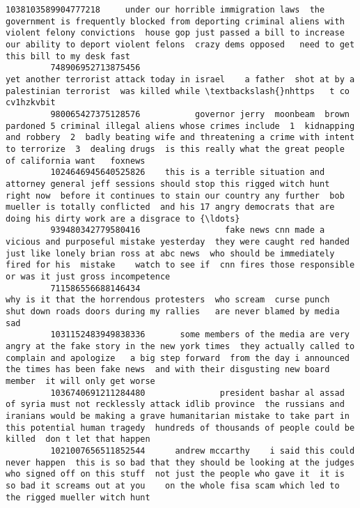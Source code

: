 \documentclass[11pt]{article}
\begin{document}
\begin{Verbatim}[commandchars=\\\{\}]
         1038103589904777218     under our horrible immigration laws  the government is frequently blocked from deporting criminal aliens with violent felony convictions  house gop just passed a bill to increase our ability to deport violent felons  crazy dems opposed   need to get this bill to my desk fast    
         748906952713875456                                                                                                                                                  yet another terrorist attack today in israel    a father  shot at by a palestinian terrorist  was killed while \textbackslash{}nhttps   t co cv1hzkvbit   
         980065427375128576           governor jerry  moonbeam  brown pardoned 5 criminal illegal aliens whose crimes include  1  kidnapping and robbery  2  badly beating wife and threatening a crime with intent to terrorize  3  dealing drugs  is this really what the great people of california want   foxnews   
         1024646945640525826    this is a terrible situation and attorney general jeff sessions should stop this rigged witch hunt right now  before it continues to stain our country any further  bob mueller is totally conflicted  and his 17 angry democrats that are doing his dirty work are a disgrace to {\ldots}   
         939480342779580416                 fake news cnn made a vicious and purposeful mistake yesterday  they were caught red handed  just like lonely brian ross at abc news  who should be immediately fired for his  mistake    watch to see if  cnn fires those responsible  or was it just gross incompetence    
         711586556688146434                                                                                                                                              why is it that the horrendous protesters  who scream  curse punch  shut down roads doors during my rallies   are never blamed by media  sad    
         1031152483949838336       some members of the media are very angry at the fake story in the new york times  they actually called to complain and apologize   a big step forward  from the day i announced  the times has been fake news  and with their disgusting new board member  it will only get worse    
         1036740691211284480               president bashar al assad of syria must not recklessly attack idlib province  the russians and iranians would be making a grave humanitarian mistake to take part in this potential human tragedy  hundreds of thousands of people could be killed  don t let that happen    
         1021007656511852544      andrew mccarthy    i said this could never happen  this is so bad that they should be looking at the judges who signed off on this stuff  not just the people who gave it  it is so bad it screams out at you    on the whole fisa scam which led to the rigged mueller witch hunt    

\end{Verbatim}
\end{document}
